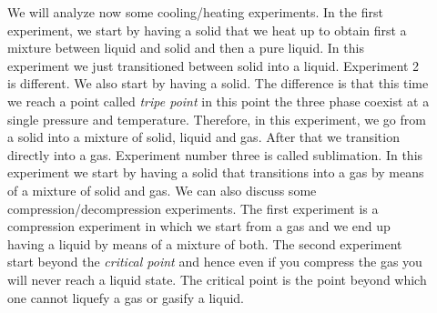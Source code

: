 \documentclass[main.tex]{subfiles}
\begin{document}
\begin{description}
\item[] 
We will analyze now some cooling/heating experiments. In the first experiment, we start by having a solid that we  heat up to obtain first a mixture between liquid and solid and then a pure liquid. In this experiment we just transitioned between solid into a liquid. Experiment 2 is different. We also start by having a solid. The difference is that this time we reach a point called \emph{tripe point} in this point the three phase coexist at a single pressure and temperature. Therefore, in this experiment, we go from a solid into a mixture of solid, liquid and gas. After that we transition directly into a gas. Experiment number three is called sublimation. In this experiment we start by having a solid that transitions into a gas by means of a mixture of solid and gas. We can also discuss some compression/decompression experiments. The first experiment is a compression experiment in which we start from a gas and we end up having a liquid by means of a mixture of both. The second experiment start beyond the \emph{critical point} and hence even if you compress the gas you will never reach a liquid state. The critical point is the point beyond which one cannot liquefy a gas or gasify a liquid.


\end{description}
\end{document}
